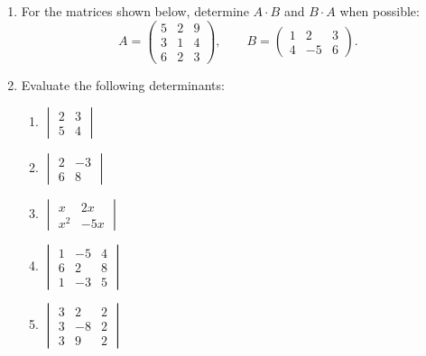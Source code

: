 \documentclass[
  english,
  12pt,
  oneside]{book}
\providecommand{\tightlist}{%
  \setlength{\itemsep}{0pt}\setlength{\parskip}{0pt}}
\theoremstyle{definition}
\theoremstyle{definition}
\theoremstyle{definition}
\theoremstyle{definition}
\theoremstyle{remark}
\begin{document}
\begin{enumerate}
  \begin{enumerate}
  \def\labelenumii{\roman{enumii})}
  \tightlist
  \item
    \(\begin{pmatrix}7&3\\1&6\end{pmatrix}+\begin{pmatrix}2&5\\4&7\end{pmatrix}\)
  \item
    \(\begin{pmatrix}5&-2\\7&9\end{pmatrix}-\begin{pmatrix}5&-4\\8&-1\end{pmatrix}\)
  \item
    \(\begin{pmatrix}12&7\\9&3\end{pmatrix}\cdot \begin{pmatrix}6&2\\5&-3\end{pmatrix}\)
  \end{enumerate}
\item
  For the matrices shown below, determine \(A\cdot B\) and \(B\cdot A\) when possible:
  \[A=\begin{pmatrix}5&2&9\\3&1&4\\6&2&3\end{pmatrix},\qquad B=\begin{pmatrix}1&2&3\\4&-5&6\end{pmatrix}.\]
\item
  Evaluate the following determinants:

  \begin{enumerate}
  \def\labelenumii{\roman{enumii})}
  \tightlist
  \item
    \(\begin{vmatrix}2&3\\5&4\end{vmatrix}\)
  \item
    \(\begin{vmatrix}2&-3\\6&8\end{vmatrix}\)
  \item
    \(\begin{vmatrix}x&2x\\x^2&-5x\end{vmatrix}\)
  \item
    \(\begin{vmatrix}1&-5&4\\6&2&8\\1&-3&5\end{vmatrix}\)
  \item
    \(\begin{vmatrix}3&2&2\\3&-8&2\\3&9&2\end{vmatrix}\)
  \end{enumerate}
\end{enumerate}
\end{document}
